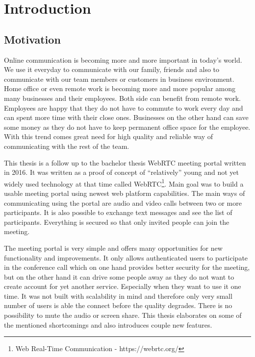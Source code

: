 \documentclass[
  digital, %
  table,   %
  lof,     %
  nolot,     %
]{fithesis3}
\begin{document}
\chapter{Introduction}
\section{Motivation}
Online communication is becoming more and more important in today’s world. We use it everyday to communicate with our family, friends and also to communicate with our team members or customers in business environment. Home office or even remote work is becoming more and more popular among many businesses and their employees. Both side can benefit from remote work. Employees are happy that they do not have to commute to work every day and can spent more time with their close ones. Businesses on the other hand can save some money as they do not have to keep permanent office space for the employee. With this trend comes great need for high quality and reliable way of communicating with the rest of the team.

This thesis is a follow up to the bachelor thesis WebRTC meeting portal  \cite{bachelorThesis} written in 2016. It was written as a proof of concept of “relatively” young and not yet widely used technology at that time called WebRTC\footnote{Web Real-Time Communication - https://webrtc.org/
}. Main goal was to build a usable meeting portal using newest web platform capabilities. The main ways of communicating using the portal are audio and video calls between two or more participants. It is also possible to exchange text messages and see the list of participants. Everything is secured so that only invited people can join the meeting.

The meeting portal is very simple and offers many opportunities for new functionality and improvements. It only allows authenticated users to participate in the conference call which on one hand provides better security for the meeting, but on the other hand it can drive some people away as they do not want to create account for yet another service. Especially when they want to use it one time. It was not built with scalability in mind and therefore only very small number of users is able the connect before the quality degrades. There is no possibility to mute the audio or screen share. This thesis elaborates on some of the mentioned shortcomings and also introduces couple new features.
\end{document}
